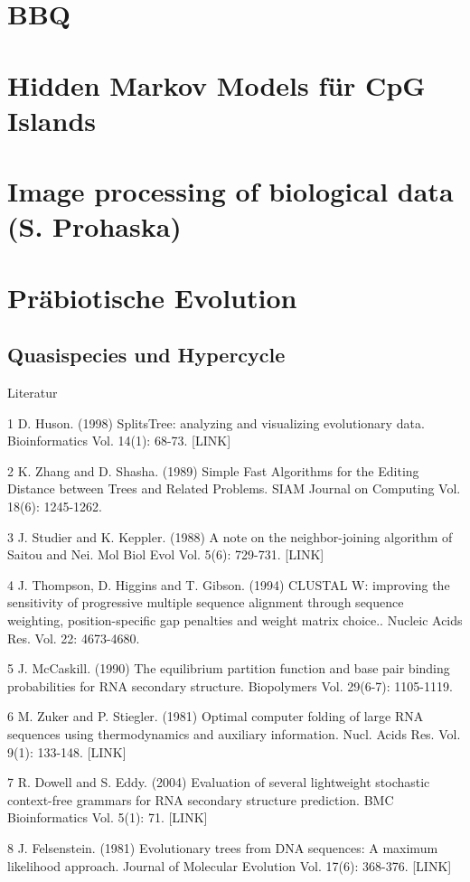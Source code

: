 \documentclass[%
   final,      %
   paper=a4,%
   paper=portrait, %
   pagesize=auto, %
   fontsize=11pt,%
 ]{scrreprt} %
\begin{document}
\section{BBQ}
\section{Hidden Markov Models für CpG Islands}
\section{Image processing of biological data (S. Prohaska)}

\section{Präbiotische Evolution}
\subsection{Quasispecies und Hypercycle}
Literatur

1
D. Huson. (1998) SplitsTree: analyzing and visualizing evolutionary data. Bioinformatics Vol. 14(1): 68-73. [LINK]

2
K. Zhang and D. Shasha. (1989) Simple Fast Algorithms for the Editing Distance between Trees and Related Problems. SIAM Journal on Computing Vol. 18(6): 1245-1262.

3
J. Studier and K. Keppler. (1988) A note on the neighbor-joining algorithm of Saitou and Nei. Mol Biol Evol Vol. 5(6): 729-731. [LINK]

4
J. Thompson, D. Higgins and T. Gibson. (1994) CLUSTAL W: improving the sensitivity of progressive multiple sequence alignment through sequence weighting, position-specific gap penalties and weight matrix choice.. Nucleic Acids Res. Vol. 22: 4673-4680.

5
J. McCaskill. (1990) The equilibrium partition function and base pair binding probabilities for RNA secondary structure. Biopolymers Vol. 29(6-7): 1105-1119.

6
M. Zuker and P. Stiegler. (1981) Optimal computer folding of large RNA sequences using thermodynamics and auxiliary information. Nucl. Acids Res. Vol. 9(1): 133-148. [LINK]

7
R. Dowell and S. Eddy. (2004) Evaluation of several lightweight stochastic context-free grammars for RNA secondary structure prediction. BMC Bioinformatics Vol. 5(1): 71. [LINK]

8
J. Felsenstein. (1981) Evolutionary trees from DNA sequences: A maximum likelihood approach. Journal of Molecular Evolution Vol. 17(6): 368-376. [LINK]
\end{document}

